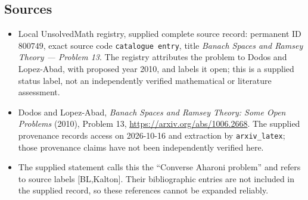 \documentclass[11pt]{article}
\begin{document}
\subsection{Sources}
\begin{itemize}
\item Local UnsolvedMath registry, supplied complete source record: permanent ID \(800749\), exact source code \texttt{catalogue entry}, title \emph{Banach Spaces and Ramsey Theory --- Problem 13}. The registry attributes the problem to Dodos and Lopez-Abad, with proposed year 2010, and labels it open; this is a supplied status label, not an independently verified mathematical or literature assessment.
\item Dodos and Lopez-Abad, \emph{Banach Spaces and Ramsey Theory: Some Open Problems} (2010), Problem 13, \url{https://arxiv.org/abs/1006.2668}. The supplied provenance records access on 2026-10-16 and extraction by \texttt{arxiv\_latex}; those provenance claims have not been independently verified here.
\item The supplied statement calls this the ``Converse Aharoni problem'' and refers to source labels [BL,Kalton]. Their bibliographic entries are not included in the supplied record, so these references cannot be expanded reliably.
\end{itemize}
\end{document}
